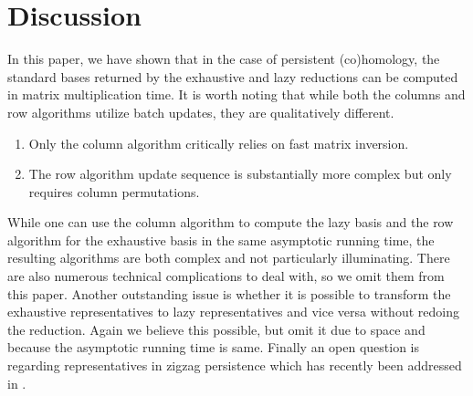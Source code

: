\documentclass[10pt,a4paper]{article}
\begin{document}
\section{Discussion}
In this paper, we have shown that in the  case of persistent (co)homology, the standard bases returned by the exhaustive and lazy reductions can be computed in matrix multiplication time. It is worth noting that while both the columns and row algorithms utilize batch updates, they are qualitatively different.
%
\begin{enumerate}
\item Only the column algorithm critically relies  on fast  matrix inversion.%
\item The row algorithm update sequence is substantially more complex %
but only requires column permutations. 
\end{enumerate}
%
While one can use the column algorithm to compute the lazy basis and the row algorithm for the exhaustive basis in the same asymptotic running time, the resulting algorithms are both complex and not particularly illuminating. There are also numerous technical complications to deal with, so we omit them from this paper. Another outstanding issue is whether it is possible to transform the exhaustive representatives to lazy representatives and vice versa without redoing the reduction. Again we believe this possible, but omit it due to space and because the asymptotic running time is same. Finally an open question is regarding representatives in zigzag persistence which has  recently been addressed in \cite{dey2021updating,dey2024fast}.


\end{document}
